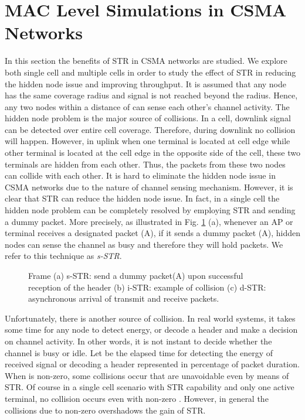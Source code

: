 \documentclass[twocolumn]{IEEEtran}
\begin{document}
\section{MAC Level Simulations in CSMA Networks}

In this section the benefits of STR in CSMA networks are studied. We
explore both single cell and multiple cells in order to study the
effect of STR in reducing the hidden node issue and improving
throughput. It is assumed that any node has the same coverage radius
 and signal is not reached beyond the radius. Hence, any two
nodes within a distance of  can sense each other's channel
activity. The hidden node problem is the major source of collisions.
In a cell, downlink signal can be detected over entire cell
coverage. Therefore, during downlink no collision will happen.
However, in uplink when one terminal is located at cell edge while
other terminal is located at the cell edge in the opposite side of
the cell, these two terminals are hidden from each other. Thus, the
packets from these two nodes can collide with each other. It is hard
to eliminate the hidden node issue in CSMA networks due to the
nature of channel sensing mechanism. However, it is clear that STR
can reduce the hidden node issue. In fact, in a single cell the
hidden node problem can be completely resolved by employing STR and
sending a dummy packet. More precisely, as illustrated in Fig.
\ref{frame} (a), whenever an AP or terminal receives a designated
packet (A), if it sends a dummy packet (A), hidden nodes can
sense the channel as busy and therefore they will hold packets. We
refer to this technique as \textit{s-STR}.


\begin{figure}[!t]

\centering {}

\caption{Frame (a) s-STR: send a dummy packet(A) upon
successful reception of the header (b) i-STR: example of collision
(c) d-STR: asynchronous arrival of transmit and receive packets.
\label{frame} }

\end{figure}

Unfortunately, there is another source of collision. In real world
systems, it takes some time for any node to detect energy, or decode
a header and make a decision on channel activity. In other words, it
is not instant to decide whether the channel is busy or idle. Let
 be the elapsed time for detecting the energy of received signal
or decoding a header represented in percentage of packet duration.
When  is non-zero, some collisions occur that are unavoidable
even by means of STR. Of course in a single cell scenario with STR
capability and only one active terminal, no collision occurs even
with non-zero . However, in general the collisions due to
non-zero  overshadows the gain of STR.
\end{document}
